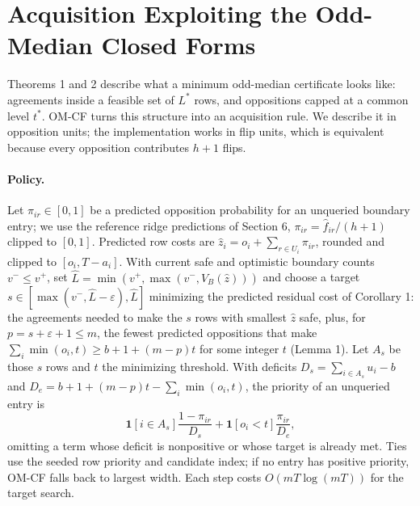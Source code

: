 \documentclass[11pt]{article}
\newcommand{\ind}{\mathbf{1}}
\begin{document}
\section{Acquisition Exploiting the Odd-Median Closed Forms}
\label{app:omcf}
Theorems 1 and 2 describe what a minimum odd-median certificate looks like: agreements inside a feasible set of $L^*$ rows, and oppositions capped at a common level $t^*$. OM-CF turns this structure into an acquisition rule. We describe it in opposition units; the implementation works in flip units, which is equivalent because every opposition contributes $h+1$ flips.

\paragraph{Policy.} Let $\pi_{ir}\in[0,1]$ be a predicted opposition probability for an unqueried boundary entry; we use the reference ridge predictions of Section 6, $\pi_{ir}=\hat f_{ir}/(h+1)$ clipped to $[0,1]$. Predicted row costs are $\hat z_i=o_i+\sum_{r\in U_i}\pi_{ir}$, rounded and clipped to $[o_i,T-a_i]$. With current safe and optimistic boundary counts $v^-\le v^+$, set $\hat L=\min(v^+,\max(v^-,V_B(\hat z)))$ and choose a target $s\in[\max(v^-,\hat L-\varepsilon),\hat L]$ minimizing the predicted residual cost of Corollary 1: the agreements needed to make the $s$ rows with smallest $\hat z$ safe, plus, for $p=s+\varepsilon+1\le m$, the fewest predicted oppositions that make $\sum_i\min(o_i,t)\ge b+1+(m-p)t$ for some integer $t$ (Lemma 1). Let $A_s$ be those $s$ rows and $t$ the minimizing threshold. With deficits $D_s=\sum_{i\in A_s}u_i-b$ and $D_e=b+1+(m-p)t-\sum_i\min(o_i,t)$, the priority of an unqueried entry is
\[
\ind[i\in A_s]\frac{1-\pi_{ir}}{D_s}+\ind[o_i<t]\frac{\pi_{ir}}{D_e},
\]
omitting a term whose deficit is nonpositive or whose target is already met. Ties use the seeded row priority and candidate index; if no entry has positive priority, OM-CF falls back to largest width. Each step costs $O(mT\log(mT))$ for the target search.
\end{document}
